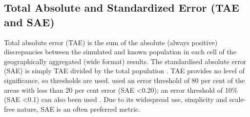 \documentclass[a4paper,10pt]{article}
\begin{document}
\subsection{Total Absolute and Standardized Error (TAE and SAE)}
Total absolute error (TAE) is the sum of the absolute (always positive)
discrepancies between the simulated
and known population in each cell of the geographically aggregated (wide format)
results. The standardised absolute error (SAE) is
simply TAE divided by the total population \citep{Voas2001}.
TAE provides no level of significance, so thresholds are used.
\citet{clarke2001regional} used an error threshold of 80 per cent of the
areas with less than 20 per cent error (SAE \textless 0.20);
an error threshold of 10\%  (SAE \textless 0.1) can also been used %
\citet{smith2007simhealth}. %
Due to its widespread use, simplicity and scale-free nature,
SAE is an often preferred metric.

% 
% 
% 
\end{document}
